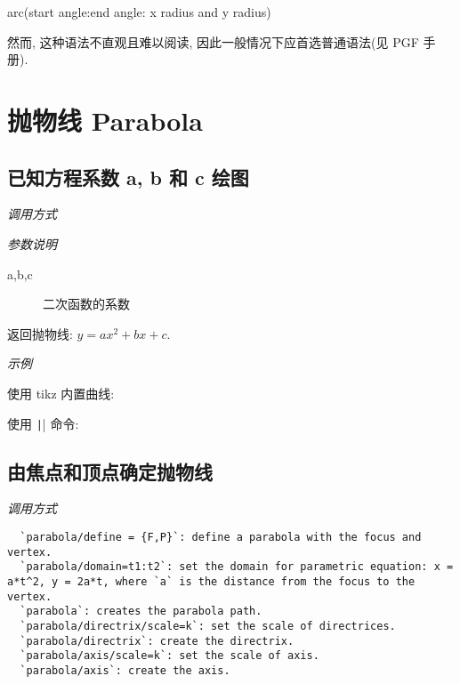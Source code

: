 arc(start angle:end angle: x radius and y radius)

然而, 这种语法不直观且难以阅读, 因此一般情况下应首选普通语法(见 PGF 手册).

\section{抛物线 Parabola}

\subsection{已知方程系数 a, b 和 c 绘图}

\emph{调用方式}

\begin{tcolorbox}{}
\end{tcolorbox}

\emph{参数说明}

\begin{description}
  \item[a,b,c] 二次函数的系数
\end{description}

返回抛物线: $y=ax^2+bx+c$.

\emph{示例}

使用 tikz 内置曲线:


使用 \texttt|\parabola| 命令:


\subsection{由焦点和顶点确定抛物线}

\emph{调用方式}

\begin{verbatim}
  `parabola/define = {F,P}`: define a parabola with the focus and vertex.
  `parabola/domain=t1:t2`: set the domain for parametric equation: x = a*t^2, y = 2a*t, where `a` is the distance from the focus to the vertex.
  `parabola`: creates the parabola path.
  `parabola/directrix/scale=k`: set the scale of directrices.
  `parabola/directrix`: create the directrix.
  `parabola/axis/scale=k`: set the scale of axis.
  `parabola/axis`: create the axis.
\end{verbatim}

